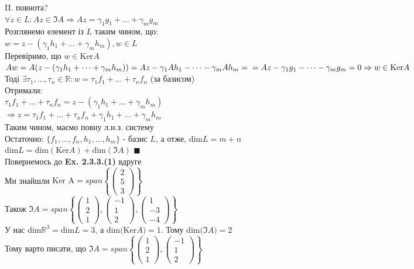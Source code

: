 \documentclass[a4paper, 14pt]{extarticle}
\def\bigline{\vspace{5mm}\\}
\def\qed{$\blacksquare$}
\def\dim#1{\textrm{dim} {#1}}
\begin{document}
	II. повнота?\\
	$\forall z \in L: Az \in \Im A \Rightarrow Az = \gamma_1 g_1 + \dots + \gamma_m g_m$\\
	Розглянемо елемент із $L$ таким чином, що:\\
	$w = z - (\gamma_1 h_1 + \dots + \gamma_m h_m), w \in L$\\
	Перевіримо, що $w \in \textrm{Ker} A$\\
	$Aw = A(z - (\gamma_1 h_1 + \dots + \gamma_m h_m)) = Az - \gamma_1 Ah_1 - \dots - \gamma_m Ah_m = \\ = Az - \gamma_1 g_1 - \dots - \gamma_m g_m = 0 \Rightarrow w \in \textrm{Ker} A$\\
	Тоді $\exists \tau_1, \dots, \tau_n \in \mathbb{R}: w = \tau_1 f_1 + \dots + \tau_n f_n$ (за базисом)\\
	Отримали:\\
	$\tau_1 f_1 + \dots + \tau_n f_n = z - (\gamma_1 h_1 + \dots + \gamma_m h_m)$\\
	$\Rightarrow z = \tau_1 f_1 + \dots + \tau_n f_n + \gamma_1 h_1 + \dots + \gamma_m h_m$\\
	Таким чином, маємо повну л.н.з. систему
	\bigline
	Остаточно: $\{f_1,\dots, f_n, h_1,\dots, h_m\}$ - базис $L$, а отже, $\dim L = m+n$\\
	$\dim L = \dim{(\textrm{Ker} A)} + \dim{(\Im A)}$ \qed
	\bigline
	Повернемось до \textbf{Ex. 2.3.3.(1)} вдруге\\
	Ми знайшли $\textrm{Ker A} = span \left\{\begin{pmatrix} 2 \\ 5 \\ 3 \end{pmatrix} \right\}$\\
	Також $\Im A = span \left\{ \begin{pmatrix} 1 \\ 2 \\ 1 \end{pmatrix}, \begin{pmatrix} -1 \\ 1 \\ 2 \end{pmatrix}, \begin{pmatrix} 1 \\ -3 \\ -4 \end{pmatrix} \right\}$\\
	У нас $\dim {\mathbb{R}^3} = \dim L = 3$, а $\dim (\textrm{Ker} A) = 1$. Тому $\dim(\Im  A) = 2$\\
	Тому варто писати, що $\Im A = span \left\{ \begin{pmatrix} 1 \\ 2 \\ 1 \end{pmatrix}, \begin{pmatrix} -1 \\ 1 \\ 2 \end{pmatrix} \right\}$\\
	
\end{document}
